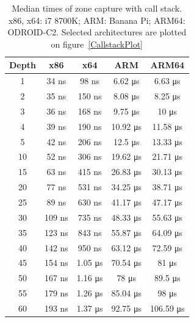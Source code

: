 \documentclass[hidelinks,titlepage,a4paper]{article}
\begin{document}
\begin{table}[h]
\centering
\begin{tabular}[h]{c|c|c|c|c}
\textbf{Depth} & \textbf{x86} & \textbf{x64} & \textbf{ARM} & \textbf{ARM64} \\ \hline
1 & 34 \si{\nano\second} & 98 \si{\nano\second} & 6.62 \si{\micro\second} & 6.63 \si{\micro\second} \\
2 & 35 \si{\nano\second} & 150 \si{\nano\second} & 8.08 \si{\micro\second} & 8.25 \si{\micro\second} \\
3 & 36 \si{\nano\second} & 168 \si{\nano\second} & 9.75 \si{\micro\second} & 10 \si{\micro\second} \\
4 & 39 \si{\nano\second} & 190 \si{\nano\second} & 10.92 \si{\micro\second} & 11.58 \si{\micro\second} \\
5 & 42 \si{\nano\second} & 206 \si{\nano\second} & 12.5 \si{\micro\second} & 13.33 \si{\micro\second} \\
10 & 52 \si{\nano\second} & 306 \si{\nano\second} & 19.62 \si{\micro\second} & 21.71 \si{\micro\second} \\
15 & 63 \si{\nano\second} & 415 \si{\nano\second} & 26.83 \si{\micro\second} & 30.13 \si{\micro\second} \\
20 & 77 \si{\nano\second} & 531 \si{\nano\second} & 34.25 \si{\micro\second} & 38.71 \si{\micro\second} \\
25 & 89 \si{\nano\second} & 630 \si{\nano\second} & 41.17 \si{\micro\second} & 47.17 \si{\micro\second} \\
30 & 109 \si{\nano\second} & 735 \si{\nano\second} & 48.33 \si{\micro\second} & 55.63 \si{\micro\second} \\
35 & 123 \si{\nano\second} & 843 \si{\nano\second} & 55.87 \si{\micro\second} & 64.09 \si{\micro\second} \\
40 & 142 \si{\nano\second} & 950 \si{\nano\second} & 63.12 \si{\micro\second} & 72.59 \si{\micro\second} \\
45 & 154 \si{\nano\second} & 1.05 \si{\micro\second} & 70.54 \si{\micro\second} & 81 \si{\micro\second} \\
50 & 167 \si{\nano\second} & 1.16 \si{\micro\second} & 78 \si{\micro\second} & 89.5 \si{\micro\second} \\
55 & 179 \si{\nano\second} & 1.26 \si{\micro\second} & 85.04 \si{\micro\second} & 98 \si{\micro\second} \\
60 & 193 \si{\nano\second} & 1.37 \si{\micro\second} & 92.75 \si{\micro\second} & 106.59 \si{\micro\second}
\end{tabular}
\caption{Median times of zone capture with call stack. x86, x64: i7 8700K; ARM: Banana Pi; ARM64: ODROID-C2. Selected architectures are plotted on figure~\ref{CallstackPlot}}
\label{CallstackTimes}
\end{table}
\end{document}
